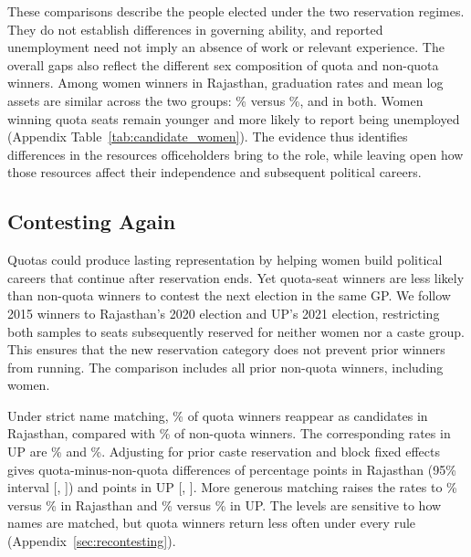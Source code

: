 \documentclass[11pt]{article}
\begin{document}


These comparisons describe the people elected under the two reservation regimes. They do not establish differences in governing ability, and reported unemployment need not imply an absence of work or relevant experience. The overall gaps also reflect the different sex composition of quota and non-quota winners. Among women winners in Rajasthan, graduation rates and mean log assets are similar across the two groups: \womenGraduateQuota{}\% versus \womenGraduateOpen{}\%, and \womenLogassetsQuota{} in both. Women winning quota seats remain younger and more likely to report being unemployed (Appendix Table~\ref{tab:candidate_women}). The evidence thus identifies differences in the resources officeholders bring to the role, while leaving open how those resources affect their independence and subsequent political careers.

\subsection{Contesting Again}\label{sec:recontesting_results}

Quotas could produce lasting representation by helping women build political careers that continue after reservation ends. Yet quota-seat winners are less likely than non-quota winners to contest the next election in the same GP. We follow 2015 winners to Rajasthan's 2020 election and UP's 2021 election, restricting both samples to seats subsequently reserved for neither women nor a caste group. This ensures that the new reservation category does not prevent prior winners from running. The comparison includes all prior non-quota winners, including women.

Under strict name matching, \recontestRajQuotaRate{}\% of quota winners reappear as candidates in Rajasthan, compared with \recontestRajNonquotaRate{}\% of non-quota winners. The corresponding rates in UP are \recontestUpQuotaRate{}\% and \recontestUpNonquotaRate{}\%. Adjusting for prior caste reservation and block fixed effects gives quota-minus-non-quota differences of \recontestRajDifference{} percentage points in Rajasthan (95\% interval [\recontestRajLow{}, \recontestRajHigh{}]) and \recontestUpDifference{} points in UP [\recontestUpLow{}, \recontestUpHigh{}]. More generous matching raises the rates to \recontestRajGenerousQuotaRate{}\% versus \recontestRajGenerousNonquotaRate{}\% in Rajasthan and \recontestUpGenerousQuotaRate{}\% versus \recontestUpGenerousNonquotaRate{}\% in UP. The levels are sensitive to how names are matched, but quota winners return less often under every rule (Appendix~\ref{sec:recontesting}).
\end{document}
